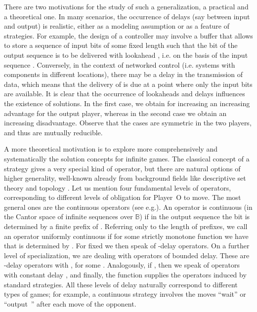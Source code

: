 \documentclass[fleqn,envcountsame]{LMCS}
\newcommand{\pO}{Player~O\xspace}
\newcommand{\B}{\ensuremath{\mathbb{B}}\xspace}
\newcommand{\ie}{i.e.\xspace}
\newcommand{\eg}{e.g.\xspace}
\begin{document}
There are two motivations for the study of such a generalization,
a practical and a theoretical one. In many scenarios, the occurrence of
delays (say between input and output) is realistic, either as a
modeling assumption or as a feature of strategies. For example,
the design of a controller may involve a buffer that allows to store
a sequence of input bits of some fixed length  such that the bit
 of the output sequence is to be delivered with lookahead ,
\ie on the basis of the input sequence . Conversely,
in the context of networked control (\ie systems with components in
different locations), there may be a delay  in the transmission of
data, which means that the delivery of  is due at a point where
only the input bits  are available. It is clear
that the occurrence of lookaheads and delays influences the existence
of solutions. In the first case, we obtain for increasing  an increasing
advantage for the output player, whereas in the second case we obtain
an increasing disadvantage. Observe that the cases are symmetric
in the two players, and thus are mutually reducible.

A more theoretical motivation is to explore more comprehensively
and systematically the solution concepts for infinite games.
The classical concept of a strategy gives a very special kind of operator,
but there are natural options of higher generality, well-known
already from background fields like descriptive set theory and topology \cite{Mosch80DST}.
Let us mention four fundamental levels of operators, corresponding to
different levels of obligation for \pO to move. The most general ones are
the continuous operators (see \eg \cite{TB73FinAutBehSynth,TL93LogSpecInfComp}).
An operator  is continuous (in the Cantor space of infinite
sequences over \B) if in the output sequence 
the bit  is determined by a finite prefix of .
Referring only to the length of prefixes, we call an operator
uniformly continuous if for some strictly monotone function  we have that 
is determined by . For fixed  we then speak of -delay operators.
On a further level of specialization, we are dealing with operators of
bounded delay. These are -delay operators with , for some .
Analogously, if , then we speak of operators with constant delay , and
finally, the function  supplies the operators induced by standard strategies.
All these levels of delay naturally correspond to different types of games;
for example, a continuous strategy involves the moves ``wait'' or
``output~'' after each move of the opponent.
\end{document}
